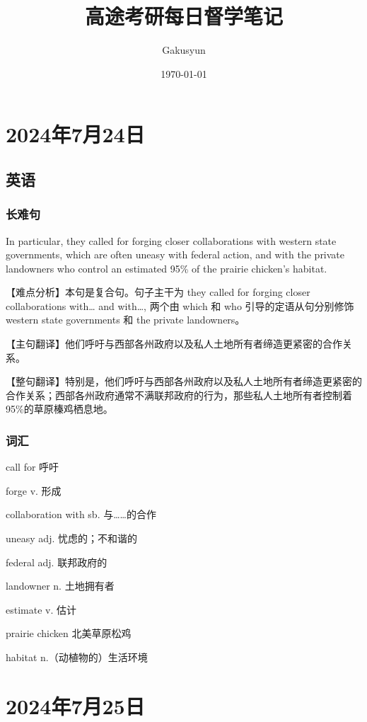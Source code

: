 \documentclass[UTF8]{ctexart}
\title{高途考研每日督学笔记}
\author{Gakusyun}
\date{\today}
\begin{document}
\maketitle
\thispagestyle{empty}
\newpage
\thispagestyle{empty}
\tableofcontents
\thispagestyle{empty}
\newpage
\setcounter{page}{1}
\section{2024年7月24日}
\subsection{英语}
\subsubsection{长难句}
In particular, they called for forging closer collaborations with western state
governments, which are often uneasy with federal action, and with the private
landowners who control an estimated 95\% of the prairie chicken's habitat.

【难点分析】本句是复合句。句子主干为 they called for forging closer
collaborations with… and with…, 两个由 which 和 who 引导的定语从句分别修饰western state governments 和 the private landowners。

【主句翻译】他们呼吁与西部各州政府以及私人土地所有者缔造更紧密的合作关系。

【整句翻译】特别是，他们呼吁与西部各州政府以及私人土地所有者缔造更紧密的合作关系；西部各州政府通常不满联邦政府的行为，那些私人土地所有者控制着 95\%的草原榛鸡栖息地。
\subsubsection{词汇}
\begin{multicols}{2}
      call for 呼吁

      forge v. 形成

      collaboration with sb. 与……的合作

      uneasy adj. 忧虑的；不和谐的

      federal adj. 联邦政府的

      landowner n. 土地拥有者

      estimate v. 估计

      prairie chicken 北美草原松鸡

      habitat n.（动植物的）生活环境
\end{multicols}
\section{2024年7月25日}
\end{document}
